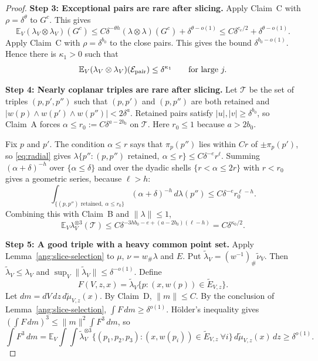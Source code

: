 \begin{proof}
\textbf{Step 3: Exceptional pairs are rare after slicing.} Apply Claim~C with $\rho=\delta^\theta$ to $G^c$. This gives
\[
 \mathbb E_V(\lambda_V\otimes\lambda_V)(G^c)\le C\delta^{-\theta h}(\lambda\otimes\lambda)(G^c)+\delta^{\theta-o(1)}\le C\delta^{c_e/2}+\delta^{\theta-o(1)}.
\]
Apply Claim~C with $\rho=\delta^{b_0}$ to the close pairs. This gives the bound $\delta^{b_0-o(1)}$. Hence there is $\kappa_1>0$ such that
\begin{equation}\label{eq:pairs}
 \mathbb E_V(\lambda_V\otimes\lambda_V)(\mathcal E_{\rm pair})\le\delta^{\kappa_1}\qquad\text{for large }j.
\end{equation}

\textbf{Step 4: Nearly coplanar triples are rare after slicing.} Let $\mathcal T$ be the set of triples $(p,p',p'')$ such that $(p,p')$ and $(p,p'')$ are both retained and $|w(p)\wedge w(p')\wedge w(p'')|<2\delta^a$. Retained pairs satisfy $|u|,|v|\ge\delta^{b_0}$, so Claim~A forces $\alpha\le r_0:=C\delta^{a-2b_0}$ on $\mathcal T$. Here $r_0\le1$ because $a>2b_0$.

Fix $p$ and $p'$. The condition $\alpha\le r$ says that $\pi_p(p'')$ lies within $Cr$ of $\pm\pi_p(p')$, so \eqref{eq:radial} gives
$\lambda\{p'':(p,p'')\text{ retained},\ \alpha\le r\}\le C\delta^{-e}r^\ell$.
Summing $(\alpha+\delta)^{-h}$ over $\{\alpha\le\delta\}$ and over the dyadic shells $\{r<\alpha\le2r\}$ with $r<r_0$ gives a geometric series, because $\ell>h$:
\[
 \int_{\{(p,p'')\text{ retained},\ \alpha\le r_0\}}(\alpha+\delta)^{-h}\,d\lambda(p'')\le C\delta^{-e}r_0^{\ell-h}.
\]
Combining this with Claim~B and $\|\lambda\|\le1$,
\begin{equation}\label{eq:triples}
 \mathbb E_V\lambda_V^{\otimes3}(\mathcal T)\le C\delta^{-3hb_0-e+(a-2b_0)(\ell-h)}=C\delta^{\kappa_0/2}.
\end{equation}

\textbf{Step 5: A good triple with a heavy common point set.} Apply Lemma~\ref{ang:slice-selection} to $\mu$, $\nu=w_\#\lambda$ and $E$. Put $\widetilde\lambda_V=(w^{-1})_\#\widetilde\nu_V$. Then $\widetilde\lambda_V\le\lambda_V$ and $\sup_V\|\widetilde\lambda_V\|\le\delta^{-o(1)}$. Define
\[
 F(V,z,x)=\widetilde\lambda_V\{p:(x,w(p))\in\widetilde E_{V,z}\}.
\]
Let $dm=dV\,dz\,d\widetilde\mu_{V,z}(x)$. By Claim~D, $\|m\|\le C$. By the conclusion of Lemma~\ref{ang:slice-selection}, $\int F\,dm\ge\delta^{o(1)}$. Hölder's inequality gives $(\int F\,dm)^3\le\|m\|^2\int F^3\,dm$, so
\[
 \int F^3\,dm=\mathbb E_V\!\int\!\!\int\widetilde\lambda_V^{\otimes3}\{(p_1,p_2,p_3):(x,w(p_i))\in\widetilde E_{V,z}\ \forall i\}\,d\widetilde\mu_{V,z}(x)\,dz\ge\delta^{o(1)}.
\]


\end{proof}
